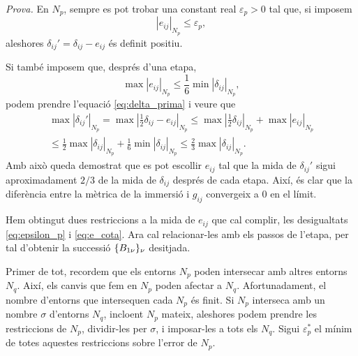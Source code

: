{\color{green!50!black} \textit{Prova.} 
En $N_p$, sempre es pot trobar una constant real $\varepsilon_p>0$ tal que, si imposem 
\begin{equation}\label{eq:epsilon_p}
    |e_{ij}|_{N_p} \le \varepsilon_p,
\end{equation}
aleshores $\delta_{ij}'= \delta_{ij} - e_{ij}$ és definit positiu.

Si també imposem que, després d'una etapa,
\begin{equation}\label{eq:e_cota}
    \max|e_{ij}|_{N_p} \le \frac16\min|\delta_{ij}|_{N_p},
\end{equation}
podem prendre l'equació \eqref{eq:delta_prima} i veure que
\begin{align}\label{eq:delta_prima_cota}
    \nonumber\max|\delta_{ij}'|_{N_p} = \max\left|\frac12\delta_{ij} - e_{ij}\right|_{N_p} \le \max\left|\frac12\delta_{ij}\right|_{N_p} + \max|e_{ij}|_{N_p} \\
    \le \frac12\max|\delta_{ij}|_{N_p} + \frac16\min|\delta_{ij}|_{N_p} \le \frac23\max|\delta_{ij}|_{N_p}.
\end{align}
Amb això queda demostrat que es pot escollir $e_{ij}$ tal que la mida de $\delta_{ij}'$ sigui aproximadament $2/3$ de la mida de $\delta_{ij}$ després de cada etapa. Així, és clar que la diferència entre la mètrica de la immersió i $g_{ij}$ convergeix a $0$ en el límit.

Hem obtingut dues restriccions a la mida de $e_{ij}$ que cal complir, les desigualtats \eqref{eq:epsilon_p} i \eqref{eq:e_cota}. Ara cal relacionar-les amb els passos de l'etapa, per tal d'obtenir la successió $\{B_{1\nu}\}_{\nu}$ desitjada. 

Primer de tot, recordem que els entorns $N_p$ poden intersecar amb altres entorns $N_q$. Així, els canvis que fem en $N_p$ poden afectar a $N_q$. Afortunadament, el nombre d'entorns que intersequen cada $N_p$ és finit. Si $N_p$ interseca amb un nombre $\sigma$ d'entorns $N_q$, incloent $N_p$ mateix, aleshores podem prendre les restriccions de $N_p$, dividir-les per $\sigma$, i imposar-les a tots els $N_q$. Sigui $\varepsilon_p^*$ el mínim de totes aquestes restriccions sobre l'error de $N_p$.

}

